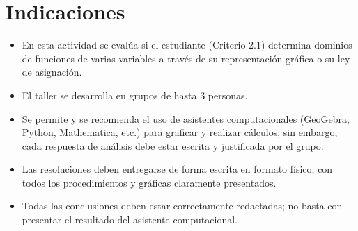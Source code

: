 \documentclass[11pt,respuestas,a4]{aleph-examen}
\begin{document}
\encabezado


\section*{Indicaciones}
\begin{itemize}[leftmargin=*]
\item
    En esta actividad se evalúa si el estudiante (Criterio 2.1) determina dominios de funciones de varias variables a través de su representación gráfica o su ley de asignación.
\item
    El taller se desarrolla en grupos de hasta 3 personas.
\item
    Se permite y se recomienda el uso de asistentes computacionales (GeoGebra, Python, Mathematica, etc.) para graficar y realizar cálculos; sin embargo, cada respuesta de análisis debe estar escrita y justificada por el grupo.
\item
    Las resoluciones deben entregarse de forma escrita en formato físico, con todos los procedimientos y gráficas claramente presentados.
\item
    Todas las conclusiones deben estar correctamente redactadas; no basta con presentar el resultado del asistente computacional.
\end{itemize}
\end{document}
